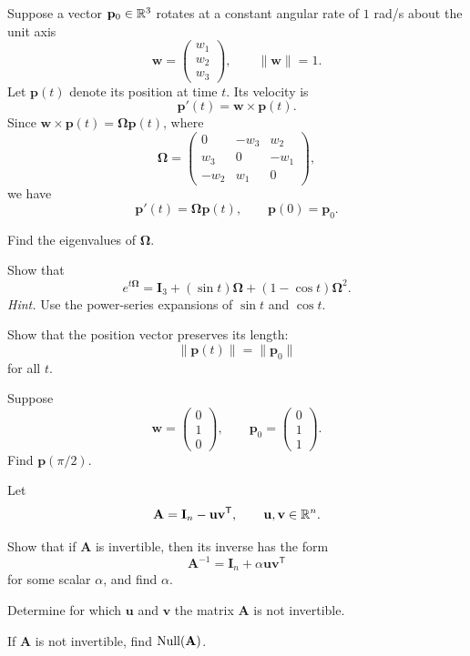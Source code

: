 \documentclass[11pt,oneside]{article}
\begin{document}
\begin{problem}
Suppose a vector $\mathbf p_0\in\mathbb{R}^3$ rotates at a constant angular rate of $1$ rad/s about the unit axis
\[
\mathbf w=
\begin{pmatrix}
w_1\\w_2\\w_3
\end{pmatrix},
\qquad
\|\mathbf w\|=1.
\]
Let $\mathbf p(t)$ denote its position at time $t$. Its velocity is
\[
\mathbf p'(t)=\mathbf w\times\mathbf p(t).
\]
Since $\mathbf w\times\mathbf p(t)=\boldsymbol\Omega\mathbf p(t)$, where
\[
\boldsymbol\Omega=
\begin{pmatrix}
0&-w_3&w_2\\
w_3&0&-w_1\\
-w_2&w_1&0
\end{pmatrix},
\]
we have
\[
\mathbf p'(t)=\boldsymbol\Omega\mathbf p(t),
\qquad
\mathbf p(0)=\mathbf p_0.
\]
\begin{problemsubparts}
\item Find the eigenvalues of $\boldsymbol\Omega$.
\item Show that
\[
e^{t\boldsymbol\Omega}
=\mathbf I_3+(\sin t)\boldsymbol\Omega+(1-\cos t)\boldsymbol\Omega^2.
\]
\textit{Hint.} Use the power-series expansions of $\sin t$ and $\cos t$.
\item Show that the position vector preserves its length:
\[
\|\mathbf p(t)\|=\|\mathbf p_0\|
\]
for all $t$.
\item Suppose
\[
\mathbf w=
\begin{pmatrix}0\\1\\0\end{pmatrix},
\qquad
\mathbf p_0=
\begin{pmatrix}0\\1\\1\end{pmatrix}.
\]
Find $\mathbf p(\pi/2)$.
\end{problemsubparts}
\end{problem}

\begin{problem}
Let
\[
\mathbf A=\mathbf I_n-\mathbf u\mathbf v^{\mathsf T},
\qquad
\mathbf u,\mathbf v\in\mathbb{R}^n.
\]
\begin{problemsubparts}
\item Show that if $\mathbf A$ is invertible, then its inverse has the form
\[
\mathbf A^{-1}=\mathbf I_n+\alpha\mathbf u\mathbf v^{\mathsf T}
\]
for some scalar $\alpha$, and find $\alpha$.
\item Determine for which $\mathbf u$ and $\mathbf v$ the matrix $\mathbf A$ is not invertible.
\item If $\mathbf A$ is not invertible, find $\operatorname{Null}(\mathbf A)$.
\end{problemsubparts}
\end{problem}
\end{document}
